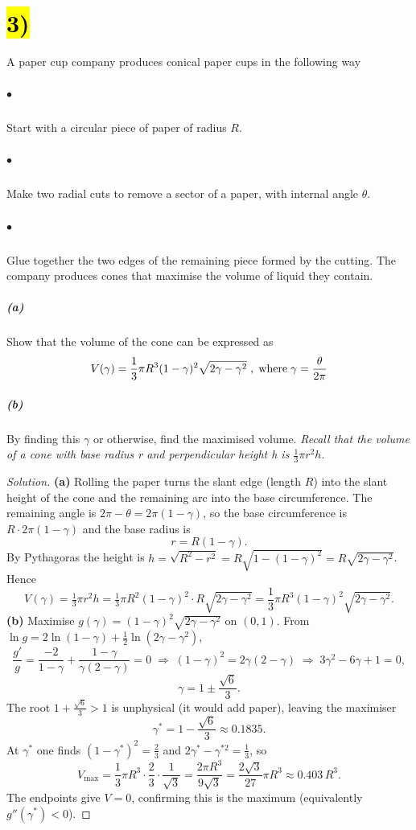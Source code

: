 \documentclass[11pt]{article}
\newcommand{\skipnewline}{\vspace*{-\baselineskip}}
\newenvironment{solution}
  {\renewcommand\qedsymbol{$\blacksquare$}\begin{proof}[Solution]}
  {\end{proof}}
\begin{document}
\section*{\hl{3)}} A paper cup company produces conical paper cups in the following way
\subparagraph*{$\bullet$} Start with a circular piece of paper of radius $R$.\skipnewline
\subparagraph*{$\bullet$} Make two radial cuts to remove a sector of a paper, with internal angle $\theta$.\skipnewline
\subparagraph*{$\bullet$} Glue together the two edges of the remaining piece formed by the cutting.\newline\newline
The company produces cones that maximise the volume of liquid they contain.
\subparagraph*{(a)} Show that the volume of the cone can be expressed as
$$V(\gamma) = \frac{1}{3}\pi R^3 (1-\gamma)^2\sqrt{2\gamma -\gamma^2} \hspace{1mm},\hspace{1mm}\text{where}\hspace{1mm}\gamma = \frac{\theta}{2\pi}$$
\subparagraph*{(b)} By finding this $\gamma$ or otherwise, find the maximised volume.\newline\newline
\textit{Recall that the volume of a cone with base radius r and perpendicular height h is $\frac{1}{3}\pi r^2 h$}.
\begin{solution}
\textbf{(a)} Rolling the paper turns the slant edge (length $R$) into the slant height of the cone and the remaining arc into the base circumference. The remaining angle is $2\pi-\theta=2\pi(1-\gamma)$, so the base circumference is $R\cdot2\pi(1-\gamma)$ and the base radius is
$$r=R(1-\gamma).$$
By Pythagoras the height is $h=\sqrt{R^2-r^2}=R\sqrt{1-(1-\gamma)^2}=R\sqrt{2\gamma-\gamma^2}$. Hence
$$V(\gamma)=\tfrac13\pi r^2h=\tfrac13\pi R^2(1-\gamma)^2\cdot R\sqrt{2\gamma-\gamma^2}=\frac{1}{3}\pi R^3(1-\gamma)^2\sqrt{2\gamma-\gamma^2}.$$
\textbf{(b)} Maximise $g(\gamma)=(1-\gamma)^2\sqrt{2\gamma-\gamma^2}$ on $(0,1)$. From $\ln g=2\ln(1-\gamma)+\tfrac12\ln(2\gamma-\gamma^2)$,
$$\frac{g'}{g}=\frac{-2}{1-\gamma}+\frac{1-\gamma}{\gamma(2-\gamma)}=0\;\Longrightarrow\;(1-\gamma)^2=2\gamma(2-\gamma)\;\Longrightarrow\;3\gamma^2-6\gamma+1=0,$$
$$\gamma=1\pm\frac{\sqrt6}{3}.$$
The root $1+\tfrac{\sqrt6}{3}>1$ is unphysical (it would add paper), leaving the maximiser
$$\gamma^\ast=1-\frac{\sqrt6}{3}\approx0.1835.$$
At $\gamma^\ast$ one finds $(1-\gamma^\ast)^2=\tfrac23$ and $2\gamma^\ast-\gamma^{\ast2}=\tfrac13$, so
$$V_{\max}=\frac13\pi R^3\cdot\frac23\cdot\frac{1}{\sqrt3}=\frac{2\pi R^3}{9\sqrt3}=\frac{2\sqrt3}{27}\pi R^3\approx0.403\,R^3.$$
The endpoints give $V=0$, confirming this is the maximum (equivalently $g''(\gamma^\ast)<0$). 
\end{solution}
\end{document}
